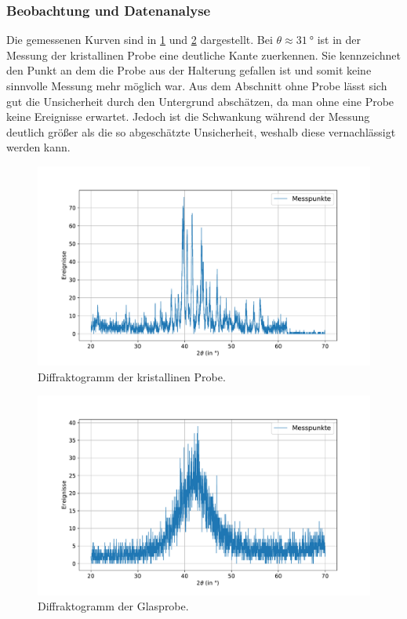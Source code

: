 \documentclass[
	a4paper,
	12pt,
	pagesize,
	ngerman
]{scrartcl}
\begin{document}
	\subsubsection{Beobachtung und Datenanalyse}
	Die gemessenen Kurven sind in \cref{fig_xrd_kristallin} und \cref{fig_xrd_glas} dargestellt.
	Bei $\theta \approx \SI{31}{\degree}$ ist in der Messung der kristallinen Probe eine deutliche Kante zuerkennen.
	Sie kennzeichnet den Punkt an dem die Probe aus der Halterung gefallen ist und somit keine sinnvolle Messung mehr möglich war.
	Aus dem Abschnitt ohne Probe lässt sich gut die Unsicherheit durch den Untergrund abschätzen, da man ohne eine Probe keine Ereignisse erwartet. %
	Jedoch ist die Schwankung während der Messung deutlich größer als die so abgeschätzte Unsicherheit, weshalb diese vernachlässigt werden kann.
	\begin{figure}[H]
			\includegraphics[width=\linewidth]{img/XRD_Kristallin_45_25.pdf}
			\caption{Diffraktogramm der kristallinen Probe.}
			\label{fig_xrd_kristallin}
	\end{figure}
	\begin{figure}[H]
			\includegraphics[width=\linewidth]{img/XRD_Glas_45_25.pdf}
			\caption{Diffraktogramm der Glasprobe.}
			\label{fig_xrd_glas}
	\end{figure}
\end{document}

